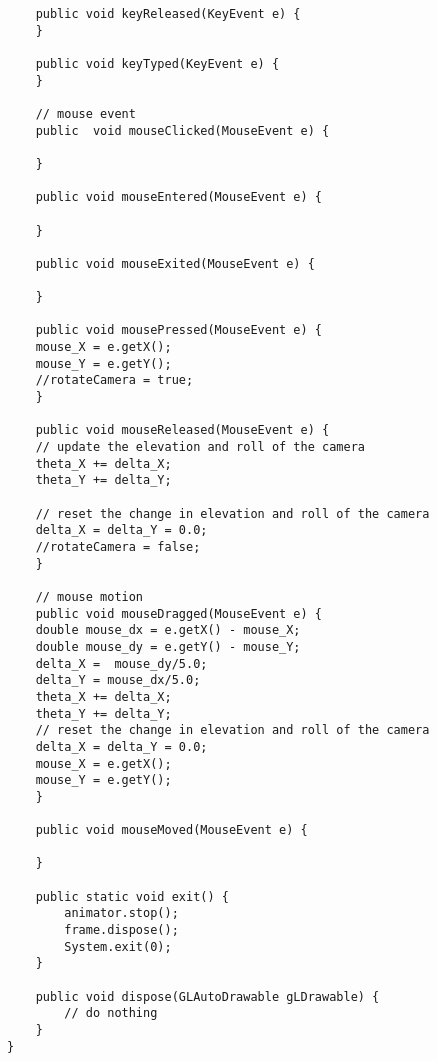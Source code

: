 \begin{lstlisting}
    public void keyReleased(KeyEvent e) {
    }
 
    public void keyTyped(KeyEvent e) {
    }
	
    // mouse event
    public  void mouseClicked(MouseEvent e) {
	
    }
	
    public void	mouseEntered(MouseEvent e) {
	
    }
	
    public void	mouseExited(MouseEvent e) {
	
    }
	
    public void	mousePressed(MouseEvent e) {
	mouse_X = e.getX();
	mouse_Y = e.getY();
	//rotateCamera = true;
    }
	
    public void	mouseReleased(MouseEvent e) {
	// update the elevation and roll of the camera
	theta_X += delta_X;
	theta_Y += delta_Y;
				
	// reset the change in elevation and roll of the camera
	delta_X = delta_Y = 0.0;
	//rotateCamera = false;
    }
	
    // mouse motion
    public void	mouseDragged(MouseEvent e) {
	double mouse_dx = e.getX() - mouse_X;
	double mouse_dy = e.getY() - mouse_Y;
	delta_X =  mouse_dy/5.0;
	delta_Y = mouse_dx/5.0;
	theta_X += delta_X;
	theta_Y += delta_Y;
	// reset the change in elevation and roll of the camera
	delta_X = delta_Y = 0.0;
	mouse_X = e.getX();
	mouse_Y = e.getY();
    }
	
    public void	mouseMoved(MouseEvent e) {
		
    }
	 
    public static void exit() {
        animator.stop();
        frame.dispose();
        System.exit(0);
    }
 
    public void dispose(GLAutoDrawable gLDrawable) {
        // do nothing
    }
}\end{lstlisting}

